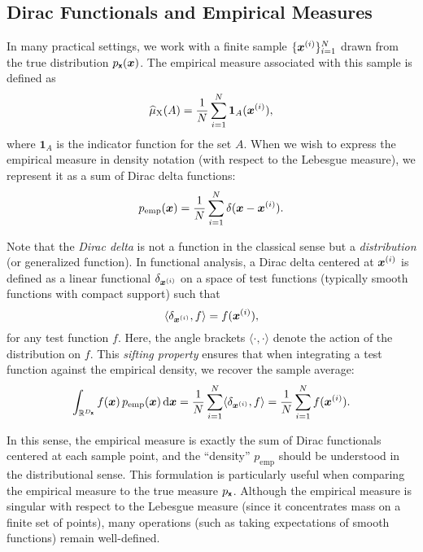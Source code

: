 \documentclass[wcp]{jmlr} %
\begin{document}
\subsection*{Dirac Functionals and Empirical Measures}

In many practical settings, we work with a finite sample \(\{\boldsymbol{x}^{(i)}\}_{i=1}^N\) drawn from the true distribution \(p_{\boldsymbol{\mathsf{x}}}(\boldsymbol{x})\). The empirical measure associated with this sample is defined as
\begin{equation}
    \ELaw[\mm{X}](A) = \frac{1}{N} \sum_{i=1}^N \mathbf{1}_A(\vv{x}^{(i)}),
\end{equation}
where \(\mathbf{1}_A\) is the indicator function for the set \(A\). When we wish to express the empirical measure in density notation (with respect to the Lebesgue measure), we represent it as a sum of Dirac delta functions:
\begin{equation}
    p_{\text{emp}}(\boldsymbol{x}) = \frac{1}{N} \sum_{i=1}^N \delta(\boldsymbol{x}-\boldsymbol{x}^{(i)}).
\end{equation}

Note that the \emph{Dirac delta} is not a function in the classical sense but a \emph{distribution} (or generalized function). In functional analysis, a Dirac delta centered at \(\boldsymbol{x}^{(i)}\) is defined as a linear functional \(\delta_{\boldsymbol{x}^{(i)}}\) on a space of test functions (typically smooth functions with compact support) such that
\begin{equation}
    \langle \delta_{\boldsymbol{x}^{(i)}}, f \rangle = f(\boldsymbol{x}^{(i)}),
\end{equation}
for any test function \(f\). Here, the angle brackets \(\langle \cdot,\cdot \rangle\) denote the action of the distribution on \(f\). This \emph{sifting property} ensures that when integrating a test function against the empirical density, we recover the sample average:
\begin{equation}
    \int_{\mathbb{R}^{D_{\boldsymbol{\mathsf{x}}}}} f(\boldsymbol{x})\,p_{\text{emp}}(\boldsymbol{x})\,\mathrm{d}\boldsymbol{x}
    = \frac{1}{N} \sum_{i=1}^N \langle \delta_{\boldsymbol{x}^{(i)}}, f \rangle
    = \frac{1}{N} \sum_{i=1}^N f(\boldsymbol{x}^{(i)}).
\end{equation}

In this sense, the empirical measure is exactly the sum of Dirac functionals centered at each sample point, and the “density” \(p_{\text{emp}}\) should be understood in the distributional sense. This formulation is particularly useful when comparing the empirical measure to the true measure \(p_{\boldsymbol{\mathsf{x}}}\). Although the empirical measure is singular with respect to the Lebesgue measure (since it concentrates mass on a finite set of points), many operations (such as taking expectations of smooth functions) remain well-defined.
\end{document}
